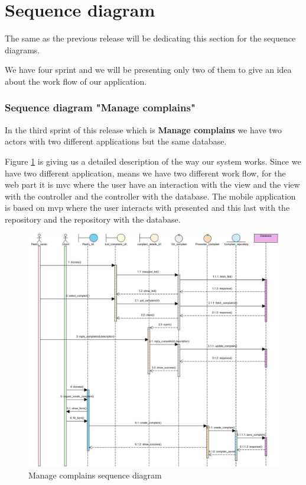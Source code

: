 \documentclass[12pt,a4paper]{report}
\begin{document}
\section{Sequence diagram}
The same as the previous release will be dedicating this section for the sequence diagrams.\par 
We have four sprint and we will be presenting only two of them to give an idea about the work flow of our application.
\subsubsection*{Sequence diagram "Manage complains"}
In the third sprint of this release which is \textbf{Manage complains} we have two actors with two different applications but the same database.\par 
Figure \ref{complains-sequence} is giving us a detailed description of the way our system works. Since we have two different application, means we have two different work flow, for the web part it is \ac{mvc} where the user have an interaction with the view and the view with the controller and the controller with the database. The mobile application is based on \ac{mvp} where the user interacts with presented and this last with the repository and the repository with the database.\par

\begin{figure}[H]
	\centering
	\includegraphics[width=7in,keepaspectratio]{managecomplains.jpg}
	\caption{Manage complains sequence diagram}
	\label{complains-sequence}
\end{figure}
\clearpage
\end{document}
